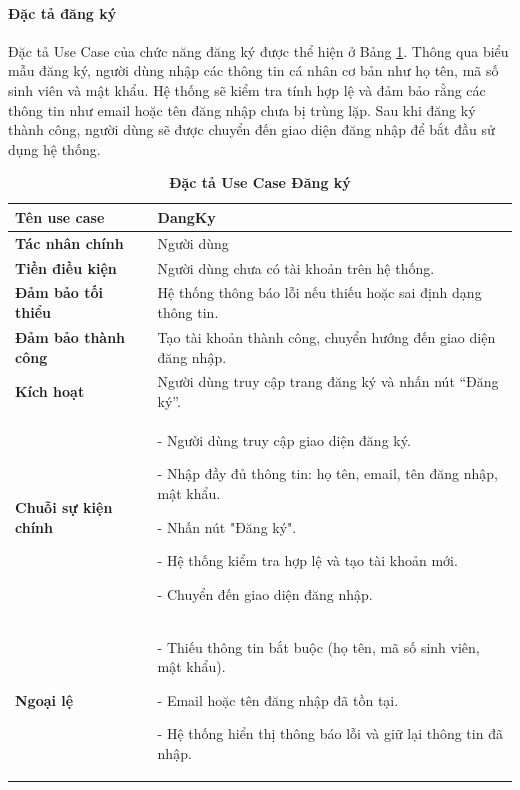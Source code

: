 \documentclass{article}
\begin{document}
	\paragraph{Đặc tả đăng ký} \mbox{}
	
	Đặc tả Use Case của chức năng đăng ký được thể hiện ở Bảng \ref{tab32}. Thông qua biểu mẫu đăng ký, người dùng nhập các thông tin cá nhân cơ bản như họ tên, mã số sinh viên và mật khẩu. Hệ thống sẽ kiểm tra tính hợp lệ và đảm bảo rằng các thông tin như email hoặc tên đăng nhập chưa bị trùng lặp. Sau khi đăng ký thành công, người dùng sẽ được chuyển đến giao diện đăng nhập để bắt đầu sử dụng hệ thống.
	
	\begin{table}[H]
		\centering
		\caption [Đặc tả Use Case Đăng ký]{\bfseries \fontsize{12pt}{0pt}\selectfont Đặc tả Use Case Đăng ký}
		\label{tab32}
		\begin{tabular}{|p{4cm}|p{10.5cm}|}
			\hline
			\textbf{Tên use case} & DangKy \\
			\hline
			\textbf{Tác nhân chính} & Người dùng \\
			\hline
			\textbf{Tiền điều kiện} & Người dùng chưa có tài khoản trên hệ thống. \\
			\hline
			\textbf{Đảm bảo tối thiểu} & Hệ thống thông báo lỗi nếu thiếu hoặc sai định dạng thông tin. \\
			\hline
			\textbf{Đảm bảo thành công} & Tạo tài khoản thành công, chuyển hướng đến giao diện đăng nhập. \\
			\hline
			\textbf{Kích hoạt} & Người dùng truy cập trang đăng ký và nhấn nút “Đăng ký”. \\
			\hline
			\textbf{Chuỗi sự kiện chính} &
			- Người dùng truy cập giao diện đăng ký.
			
			- Nhập đầy đủ thông tin: họ tên, email, tên đăng nhập, mật khẩu.
			
			- Nhấn nút "Đăng ký".
			
			- Hệ thống kiểm tra hợp lệ và tạo tài khoản mới.
			
			- Chuyển đến giao diện đăng nhập.
			\\
			\hline
			\textbf{Ngoại lệ} &
			- Thiếu thông tin bắt buộc (họ tên, mã số sinh viên, mật khẩu).
			
			- Email hoặc tên đăng nhập đã tồn tại.
			
			- Hệ thống hiển thị thông báo lỗi và giữ lại thông tin đã nhập.
			\\
			\hline
		\end{tabular}
	\end{table}
	
\end{document}
